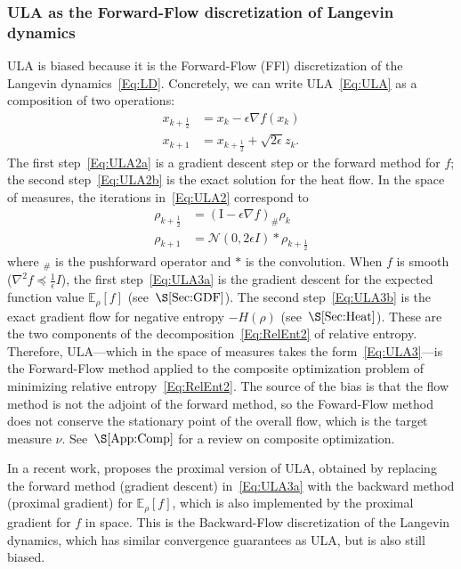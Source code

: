 \documentclass[final,12pt]{colt2018}
\newcommand{\E}{\mathbb{E}}
\newcommand{\N}{\mathcal{N}}
\newcommand{\I}{\mathrm{I}}
\begin{document}
\subsubsection{ULA as the Forward-Flow discretization of Langevin dynamics}


ULA is biased because it is the Forward-Flow (FFl) discretization of the Langevin dynamics~\eqref{Eq:LD}.
Concretely, we can write ULA~\eqref{Eq:ULA} as a composition of two operations:
\begin{subequations}\label{Eq:ULA2}
\begin{align}
x_{k+\frac{1}{2}} &= x_k - \epsilon \nabla f(x_k) \label{Eq:ULA2a} \\
x_{k+1} &= x_{k+\frac{1}{2}} + \sqrt{2\epsilon} z_k.  \label{Eq:ULA2b}
\end{align}
\end{subequations}
The first step~\eqref{Eq:ULA2a} is a gradient descent step or the forward method for $f$;
the second step~\eqref{Eq:ULA2b} is the exact solution for the heat flow.
In the space of measures, the iterations in~\eqref{Eq:ULA2} correspond to
\begin{subequations}\label{Eq:ULA3}
\begin{align}
\rho_{k+\frac{1}{2}} &= (\I - \epsilon \nabla f)_\# \rho_k \label{Eq:ULA3a} \\
\rho_{k+1} &= \N(0,2\epsilon I) \ast \rho_{k+\frac{1}{2}} \label{Eq:ULA3b} 
\end{align}
\end{subequations}
where $\phantom{}_\#$ is the pushforward operator and $\ast$ is the convolution.
When $f$ is smooth ($\nabla^2 f \preceq \frac{1}{\epsilon} I$), 
the first step~\eqref{Eq:ULA3a} is the gradient descent for the expected function value $\E_\rho[f]$ (see~$\S\ref{Sec:GDF}$).
The second step~\eqref{Eq:ULA3b} is the exact gradient flow for negative entropy $-H(\rho)$ (see~$\S\ref{Sec:Heat}$).
These are the two components of the decomposition~\eqref{Eq:RelEnt2} of relative entropy. 
Therefore, ULA---which in the space of measures takes the form~\eqref{Eq:ULA3}---is the Forward-Flow method applied to the composite optimization problem of minimizing relative entropy~\eqref{Eq:RelEnt2}.
The source of the bias is that the flow method is not the adjoint of the forward method,
so the Foward-Flow method does not conserve the stationary point of the overall flow, which is the target measure $\nu$.
See~$\S\ref{App:Comp}$ for a review on composite optimization.

In a recent work, \cite{B18} proposes the proximal version of ULA, obtained by replacing the forward method (gradient descent) in~\eqref{Eq:ULA3a} with the backward method (proximal gradient) for $\E_\rho[f]$, which is also implemented by the proximal gradient for $f$ in space.
This is the Backward-Flow discretization of the Langevin dynamics,
which has similar convergence guarantees as ULA,
but is also still biased. 
\end{document}
